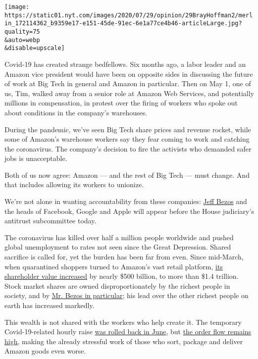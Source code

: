 \texttt{[image: https://static01.nyt.com/images/2020/07/29/opinion/29BrayHoffman2/merlin\_172114362\_b9359e17-e151-45de-91ec-6e1a77ce4b46-articleLarge.jpg?quality=75\\\&auto=webp\\\&disable=upscale]}

Covid-19 has created strange bedfellows. Six months ago, a labor leader
and an Amazon vice president would have been on opposite sides in
discussing the future of work at Big Tech in general and Amazon in
particular. Then on May 1, one of us, Tim, walked away from a senior
role at Amazon Web Services, and potentially millions in compensation,
in protest over the firing of workers who spoke out about conditions in
the company's warehouses.

During the pandemic, we've seen Big Tech share prices and revenue
rocket, while some of Amazon's warehouse workers say they fear coming to
work and catching the coronavirus. The company's decision to fire the
activists who demanded safer jobs is unacceptable.

Both of us now agree: Amazon --- and the rest of Big Tech --- must
change. And that includes allowing its workers to unionize.

We're not alone in wanting accountability from these companies:
\href{https://www.nytimes.com/2020/07/28/technology/amazon-apple-facebook-google-antitrust-hearing.html}{Jeff
Bezos} and the heads of Facebook, Google and Apple will appear before
the House judiciary's antitrust subcommittee today.

The coronavirus has killed over half a million people worldwide and
pushed global unemployment to rates not seen since the Great Depression.
Shared sacrifice is called for, yet the burden has been far from even.
Since mid-March, when quarantined shoppers turned to Amazon's vast
retail platform,
\href{https://ycharts.com/companies/AMZN/market_cap}{its shareholder
value increased} by nearly \$500 billion, to more than \$1.4 trillion.
Stock market shares are owned disproportionately by the richest people
in society, and by
\href{https://www.vox.com/recode/2020/7/21/21332166/tech-billionaires-wealth-elon-musk-steve-ballmer-jeff-bezos-pandemic-covid}{Mr.
Bezos in particular}; his lead over the other richest people on earth
has increased markedly.

This wealth is not shared with the workers who help create it. The
temporary Covid-19-related hourly raise
\href{https://www.nytimes.com/2020/07/14/business/coronavirus-essential-workers-pay-raises.html}{was
rolled back in June}, but
\href{https://finance.yahoo.com/news/amazon-amzn-beat-q2-earnings-125512326.html}{the
order flow remains high}, making the already stressful work of those who
sort, package and deliver Amazon goods even worse.

